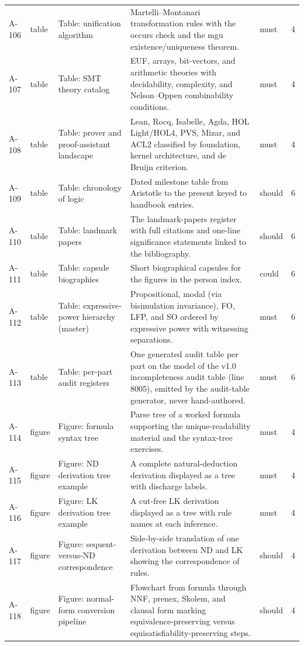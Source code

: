 \begin{longtable}{@{}p{0.45in}p{0.78in}p{2.02in}p{2.6in}p{0.42in}p{0.16in}@{}}
A-106 & table & Table: unification algorithm & Martelli--Montanari transformation rules with the occurs check and the mgu existence/uniqueness theorem. & must & 4 \\
A-107 & table & Table: SMT theory catalog & EUF, arrays, bit-vectors, and arithmetic theories with decidability, complexity, and Nelson--Oppen combinability conditions. & must & 4 \\
A-108 & table & Table: prover and proof-assistant landscape & Lean, Rocq, Isabelle, Agda, HOL Light/HOL4, PVS, Mizar, and ACL2 classified by foundation, kernel architecture, and de Bruijn criterion. & must & 4 \\
A-109 & table & Table: chronology of logic & Dated milestone table from Aristotle to the present keyed to handbook entries. & should & 6 \\
A-110 & table & Table: landmark papers & The landmark-papers register with full citations and one-line significance statements linked to the bibliography. & should & 6 \\
A-111 & table & Table: capsule biographies & Short biographical capsules for the figures in the person index. & could & 6 \\
A-112 & table & Table: expressive-power hierarchy (master) & Propositional, modal (via bisimulation invariance), FO, LFP, and SO ordered by expressive power with witnessing separations. & must & 6 \\
A-113 & table & Table: per-part audit registers & One generated audit table per part on the model of the v1.0 incompleteness audit table (line 8005), emitted by the audit-table generator, never hand-authored. & must & 6 \\
A-114 & figure & Figure: formula syntax tree & Parse tree of a worked formula supporting the unique-readability material and the syntax-tree exercises. & must & 4 \\
A-115 & figure & Figure: ND derivation tree example & A complete natural-deduction derivation displayed as a tree with discharge labels. & must & 4 \\
A-116 & figure & Figure: LK derivation tree example & A cut-free LK derivation displayed as a tree with rule names at each inference. & must & 4 \\
A-117 & figure & Figure: sequent-versus-ND correspondence & Side-by-side translation of one derivation between ND and LK showing the correspondence of rules. & should & 4 \\
A-118 & figure & Figure: normal-form conversion pipeline & Flowchart from formula through NNF, prenex, Skolem, and clausal form marking equivalence-preserving versus equisatisfiability-preserving steps. & should & 4 \\

\end{longtable}
